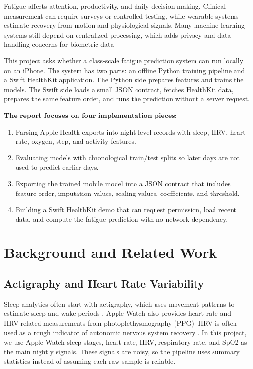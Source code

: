 \documentclass[sigconf,10pt]{acmart}
\begin{document}
Fatigue affects attention, productivity, and daily decision making. Clinical measurement can require surveys or controlled testing, while wearable systems estimate recovery from motion and physiological signals. Many machine learning systems still depend on centralized processing, which adds privacy and data-handling concerns for biometric data \cite{chen2021privacy}.

This project asks whether a class-scale fatigue prediction system can run locally on an iPhone. The system has two parts: an offline Python training pipeline and a Swift HealthKit application. The Python side prepares features and trains the models. The Swift side loads a small JSON contract, fetches HealthKit data, prepares the same feature order, and runs the prediction without a server request.

\textbf{The report focuses on four implementation pieces:}
\begin{enumerate}
    \item Parsing Apple Health exports into night-level records with sleep, HRV, heart-rate, oxygen, step, and activity features.
    \item Evaluating models with chronological train/test splits so later days are not used to predict earlier days.
    \item Exporting the trained mobile model into a JSON contract that includes feature order, imputation values, scaling values, coefficients, and threshold.
    \item Building a Swift HealthKit demo that can request permission, load recent data, and compute the fatigue prediction with no network dependency.
\end{enumerate}

\section{Background and Related Work}

\subsection{Actigraphy and Heart Rate Variability}
Sleep analytics often start with actigraphy, which uses movement patterns to estimate sleep and wake periods \cite{marinez2022actigraphy}. Apple Watch also provides heart-rate and HRV-related measurements from photoplethysmography (PPG). HRV is often used as a rough indicator of autonomic nervous system recovery \cite{shaffer2017hrv}. In this project, we use Apple Watch sleep stages, heart rate, HRV, respiratory rate, and SpO2 as the main nightly signals. These signals are noisy, so the pipeline uses summary statistics instead of assuming each raw sample is reliable.
\end{document}
